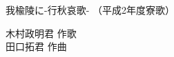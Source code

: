 \documentclass[10pt,b5j]{tarticle} %
\begin{document}
\begin{minipage}[c]{0.7\hsize} %
    \begin{center}
        {\LARGE
            我楡陵に-行秋哀歌- %
        }
        {\small 
            （平成2年度寮歌） %
        }
    \end{center}
\end{minipage}
\begin{minipage}[c]{0.3\hsize} %
    \begin{flushright} %
        木村政明君 作歌\\田口拓君 作曲 %
    \end{flushright}
\end{minipage}
\end{document}

